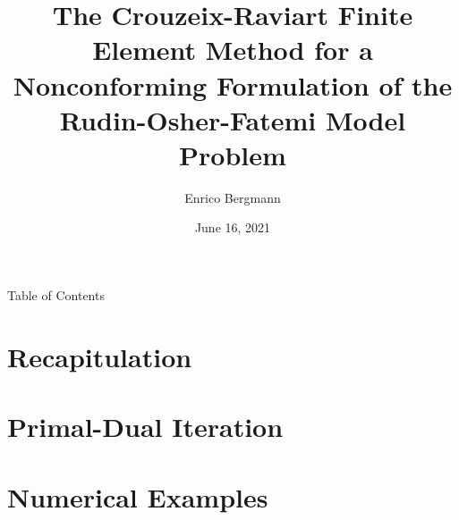\documentclass[xcolor=svgnames,english]{beamer}
\author{Enrico Bergmann}
\title{The Crouzeix-Raviart Finite Element Method for a Nonconforming
Formulation of the Rudin-Osher-Fatemi Model Problem}
\institute{Humboldt-Universität zu Berlin}
\date{June 16, 2021}
\begin{document}
\begin{frame}
	\maketitle
\end{frame}
  
\begin{frame}{Table of Contents}
  \tableofcontents
\end{frame}


\section{Recapitulation}



\section{Primal-Dual Iteration}


\section{Numerical Examples}

\end{document}
